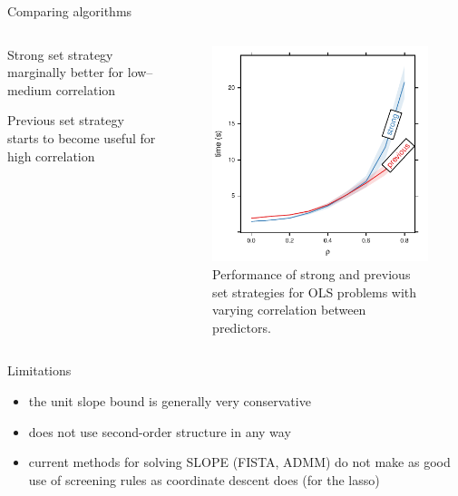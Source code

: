 \documentclass[10pt,ignorenonframetext]{beamer}
\begin{document}
\begin{frame}{Comparing algorithms}
\begin{columns}
    \begin{column}{0.45\linewidth}
        Strong set strategy marginally better for low--medium correlation\medskip
        
        Previous set strategy starts to become useful for high correlation
    \end{column}
    \begin{column}{0.45\linewidth}
        \begin{figure}
            \centering
            \includegraphics[width=\textwidth]{figures/algorithms.pdf}
            \caption{Performance of strong and previous set strategies for 
                     OLS problems with varying correlation between predictors.}
        \end{figure}
    \end{column}
\end{columns}
\end{frame}

\begin{frame}{Limitations}
\begin{itemize}
    \item the unit slope bound is generally very conservative
    \item does not use second-order structure in any way
    \item current methods for solving SLOPE (FISTA, ADMM) do not make as good use of
          screening rules as coordinate descent does (for the lasso)
\end{itemize}
\end{frame}
\end{document}
